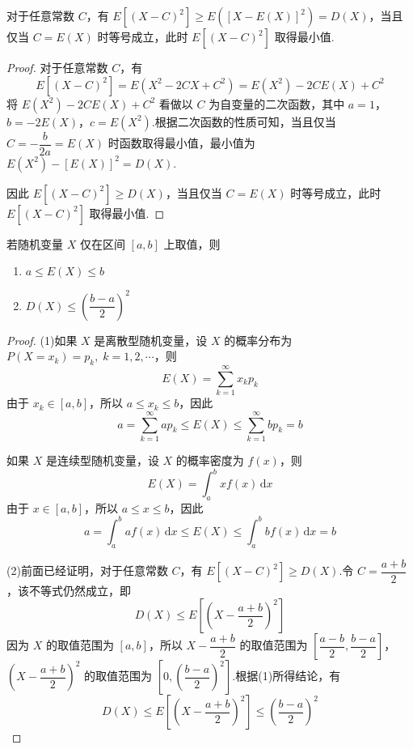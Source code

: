 \begin{conclusion}
    \indent 对于任意常数 $C$，有 $E[(X-C)^2] \geqslant E([X-E(X)]^2) = D(X)$，当且仅当 $C=E(X)$ 时等号成立，此时 $E[(X-C)^2]$ 取得最小值.
\end{conclusion}

\begin{proof}
    对于任意常数 $C$，有
    $$
    E[(X-C)^2] = E(X^2 - 2CX + C^2) = E(X^2) - 2CE(X) + C^2
    $$
    将 $E(X^2) - 2CE(X) + C^2$ 看做以 $C$ 为自变量的二次函数，其中 $a=1$，$b=-2E(X)$，$c=E(X^2)$.根据二次函数的性质可知，当且仅当 $C=-\dfrac{b}{2a}=E(X)$ 时函数取得最小值，最小值为 $E(X^2) - [E(X)]^2 = D(X)$.
    
    因此 $E[(X-C)^2] \geqslant D(X)$，当且仅当 $C=E(X)$ 时等号成立，此时 $E[(X-C)^2]$ 取得最小值.
\end{proof}

\begin{conclusion}
    \indent 若随机变量 $X$ 仅在区间 $[a,b]$ 上取值，则
    \begin{enumerate}
        \item $a \leqslant E(X) \leqslant b$
        \item $D(X) \leqslant \left( \dfrac{b-a}{2} \right)^2$
    \end{enumerate}
\end{conclusion}

\begin{proof}
    (1)如果 $X$ 是离散型随机变量，设 $X$ 的概率分布为 $P(X = x_k) = p_k, \; k=1,2,\cdots$，则
    $$
    E(X) = \sum_{k=1}^{\infty} x_k p_k
    $$
    由于 $x_k \in [a,b]$，所以 $a \leqslant x_k \leqslant b$，因此
    $$
    a = \sum_{k=1}^{\infty} a p_k \leqslant E(X) \leqslant \sum_{k=1}^{\infty} b p_k = b
    $$

    如果 $X$ 是连续型随机变量，设 $X$ 的概率密度为 $f(x)$，则
    $$
    E(X) = \int_{a}^{b} x f(x)\,\text{d}x
    $$
    由于 $x \in [a,b]$，所以 $a \leqslant x \leqslant b$，因此
    $$
    a = \int_{a}^{b} a f(x)\,\text{d}x \leqslant E(X) \leqslant \int_{a}^{b} b f(x)\,\text{d}x = b
    $$

    (2)前面已经证明，对于任意常数 $C$，有 $E[(X-C)^2] \geqslant D(X)$.令 $C = \dfrac{a+b}{2}$，该不等式仍然成立，即
    $$
    D(X) \leqslant E[(X - \dfrac{a+b}{2})^2 ]
    $$
    因为 $X$ 的取值范围为 $[a,b]$，所以 $X - \dfrac{a+b}{2}$ 的取值范围为 $\left[ \dfrac{a-b}{2}, \dfrac{b-a}{2} \right]$，$\left( X - \dfrac{a+b}{2} \right)^2$ 的取值范围为 $\left[ 0, \left( \dfrac{b-a}{2} \right)^2 \right]$.根据(1)所得结论，有
    $$
    D(X) \leqslant E[(X - \dfrac{a+b}{2})^2] \leqslant \left( \dfrac{b-a}{2} \right)^2
    $$
\end{proof}

